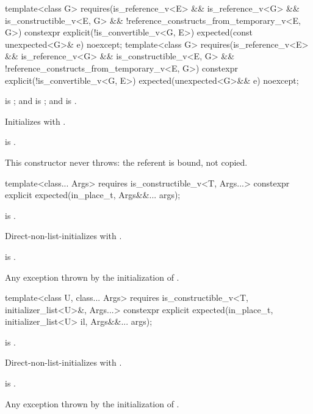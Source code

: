 %
\begin{itemdecl}
template<class G>
  requires(is_reference_v<E> && is_reference_v<G> && is_constructible_v<E, G> &&
           !reference_constructs_from_temporary_v<E, G>)
constexpr explicit(!is_convertible_v<G, E>) expected(const unexpected<G>& e) noexcept;
template<class G>
  requires(is_reference_v<E> && is_reference_v<G> && is_constructible_v<E, G> &&
           !reference_constructs_from_temporary_v<E, G>)
constexpr explicit(!is_convertible_v<G, E>) expected(unexpected<G>&& e) noexcept;
\end{itemdecl}

\begin{itemdescr}
\pnum
\constraints
{} is ; and  is ; and  is .

\pnum
\effects
Initializes  with .

\pnum
\ensures
{} is .

\pnum
\remarks
This constructor never throws: the referent is bound, not copied.
\end{itemdescr}

%
\begin{itemdecl}
template<class... Args>
  requires is_constructible_v<T, Args...>
constexpr explicit expected(in_place_t, Args&&... args);
\end{itemdecl}

\begin{itemdescr}
\pnum
\constraints
{} is .

\pnum
\effects
Direct-non-list-initializes  with .

\pnum
\ensures
{} is .

\pnum
\throws
Any exception thrown by the initialization of .
\end{itemdescr}

%
\begin{itemdecl}
template<class U, class... Args>
  requires is_constructible_v<T, initializer_list<U>&, Args...>
constexpr explicit expected(in_place_t, initializer_list<U> il, Args&&... args);
\end{itemdecl}

\begin{itemdescr}
\pnum
\constraints
{} is .

\pnum
\effects
Direct-non-list-initializes  with .

\pnum
\ensures
{} is .

\pnum
\throws
Any exception thrown by the initialization of .
\end{itemdescr}

